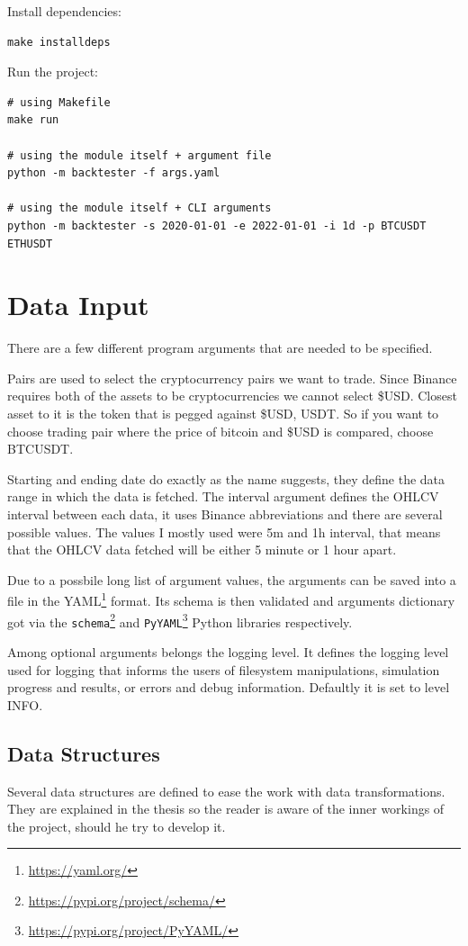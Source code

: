 Install dependencies:
\begin{verbatim}
make installdeps
\end{verbatim}

Run the project:
\begin{verbatim}
# using Makefile
make run

# using the module itself + argument file
python -m backtester -f args.yaml

# using the module itself + CLI arguments
python -m backtester -s 2020-01-01 -e 2022-01-01 -i 1d -p BTCUSDT ETHUSDT
\end{verbatim}

\section{Data Input}
There are a few different program arguments that are needed to be specified.

Pairs are used to select the cryptocurrency pairs we want to trade. Since Binance requires both of the assets to be cryptocurrencies we cannot select \$USD. Closest asset to it is the token that is pegged against \$USD, USDT. So if you want to choose trading pair where the price of bitcoin and \$USD is compared, choose BTCUSDT.

Starting and ending date do exactly as the name suggests, they define the data range in which the data is fetched. The interval argument defines the OHLCV interval between each data, it uses Binance abbreviations and there are several possible values. The values I mostly used were 5m and 1h interval, that means that the OHLCV data fetched will be either 5 minute or 1 hour apart.

Due to a possbile long list of argument values, the arguments can be saved into a file in the YAML\footnote{\url{https://yaml.org/}} format. Its schema is then validated and arguments dictionary got via the \texttt{schema}\footnote{\url{https://pypi.org/project/schema/}} and \texttt{PyYAML}\footnote{\url{https://pypi.org/project/PyYAML/}} Python libraries respectively.

Among optional arguments belongs the logging level. It defines the logging level used for logging that informs the users of filesystem manipulations, simulation progress and results, or errors and debug information. Defaultly it is set to level INFO.

\subsection*{Data Structures}
Several data structures are defined to ease the work with data transformations. They are explained in the thesis so the reader is aware of the inner workings of the project, should he try to develop it.

